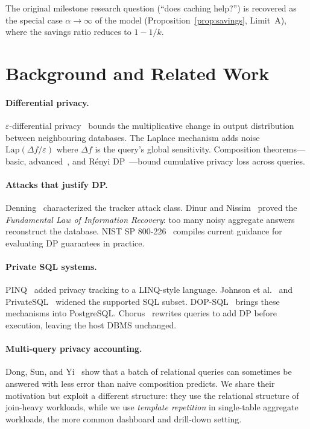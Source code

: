 \documentclass[sigconf,nonacm]{acmart}
\newcommand{\eps}{\varepsilon}
\newcommand{\Lap}{\mathrm{Lap}}
\begin{document}
The original milestone research question (``does caching help?'') is recovered as the special case $\alpha \to \infty$ of the model (Proposition~\ref{prop:savings}, Limit~A), where the savings ratio reduces to $1-1/k$.

\section{Background and Related Work}
\label{sec:related}

\paragraph{Differential privacy.}
$\eps$-differential privacy~\cite{dwork2006calibrating,dwork2014algorithmic} bounds the multiplicative change in output distribution between neighbouring databases. The Laplace mechanism adds noise $\Lap(\Delta f/\eps)$ where $\Delta f$ is the query's global sensitivity. Composition theorems---basic, advanced~\cite{dwork2010boosting}, and R\'enyi DP~\cite{mironov2017renyi}---bound cumulative privacy loss across queries.

\paragraph{Attacks that justify DP.}
Denning~\cite{denning1979tracker} characterized the tracker attack class. Dinur and Nissim~\cite{dinur2003revealing} proved the \emph{Fundamental Law of Information Recovery}: too many noisy aggregate answers reconstruct the database. NIST SP 800-226~\cite{nist2025sp800226} compiles current guidance for evaluating DP guarantees in practice.

\paragraph{Private SQL systems.}
PINQ~\cite{mcsherry2009privacy} added privacy tracking to a LINQ-style language. Johnson et al.~\cite{johnson2018towards} and PrivateSQL~\cite{kotsogiannis2019privatesql} widened the supported SQL subset. DOP-SQL~\cite{yu2024dopsql} brings these mechanisms into PostgreSQL. Chorus~\cite{johnson2020chorus} rewrites queries to add DP before execution, leaving the host DBMS unchanged.

\paragraph{Multi-query privacy accounting.}
Dong, Sun, and Yi~\cite{dong2023better} show that a batch of relational queries can sometimes be answered with less error than naive composition predicts. We share their motivation but exploit a different structure: they use the relational structure of join-heavy workloads, while we use \emph{template repetition} in single-table aggregate workloads, the more common dashboard and drill-down setting.
\end{document}
